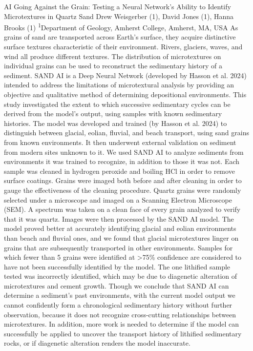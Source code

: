 \makeabstract
{
AI Going Against the Grain: Testing a Neural Network’s Ability to Identify Microtextures in Quartz Sand 
}
{
Drew Weisgerber (1), David Jones (1), Hanna Brooks (1)
}
{
\textsuperscript{1}Department of Geology, Amherst College, Amherst, MA, USA
}
{
As grains of sand are transported across Earth’s surface, they acquire distinctive surface textures characteristic of their environment. Rivers, glaciers, waves, and wind all produce different textures. The distribution of microtextures on individual grains can be used to reconstruct the sedimentary history of a sediment. SAND AI is a Deep Neural Network (developed by Hasson et al. 2024) intended to address the limitations of microtextural analysis by providing an objective and qualitative method of determining depositional environments. This study investigated the extent to which successive sedimentary cycles can be derived from the model’s output, using samples with known sedimentary histories.
}
{
The model was developed and trained (by Hasson et al. 2024) to distinguish between glacial, eolian, fluvial, and beach transport, using sand grains from known environments. It then underwent external validation on sediment from modern sites unknown to it. We used SAND AI to analyze sediments from environments it was trained to recognize, in addition to those it was not. Each sample was cleaned in hydrogen peroxide and boiling HCl in order to remove surface coatings. Grains were imaged both before and after cleaning in order to gauge the effectiveness of the cleaning procedure. Quartz grains were randomly selected
under a microscope and imaged on a Scanning Electron Microscope (SEM). A spectrum was taken on a clean face of every grain analyzed to verify that it was quartz. Images were then processed by the SAND AI model. 
}
{
The model proved better at accurately identifying glacial and eolian environments than beach and fluvial ones, and we found that glacial microtextures linger on grains that are subsequently transported in other environments. Samples for which fewer than 5 grains were identified at >75\% confidence are considered to have not been successfully identified by the model. The one lithified sample tested was incorrectly identified, which may be due to diagenetic alteration of microtextures and cement growth. 
}
{
Though we conclude that SAND AI can determine a sediment’s past environments, with the current model output we cannot confidently form a chronological sedimentary history without further observation, because it does not recognize cross-cutting relationships between microtextures. In addition, more work is needed to determine if the model can successfully be applied to uncover the transport history of lithified sedimentary rocks, or if diagenetic alteration renders the model inaccurate.
}

\newpage
